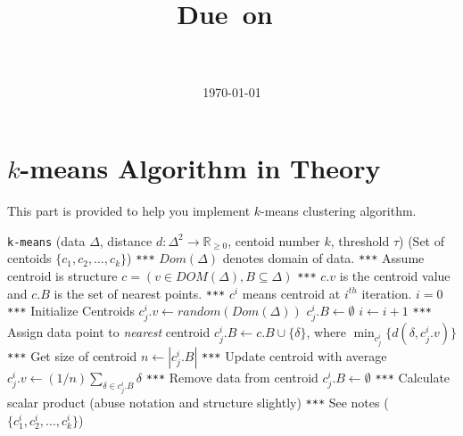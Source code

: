 \documentclass{article}
\title{
\vspace{2in}
\textmd{\textbf{\hmwkClass\ \hmwkTitle}}\\
\normalsize\vspace{0.1in}\small{Due\ on\ \hmwkDueDate}\\
\vspace{0.1in}\large{\textit{\hmwkClassInstructor\ }}
\vspace{3in}
}
\author{\textbf{\hmwkAuthorName}}
\date{\today} %
\begin{document}
\maketitle



\newpage





\section*{ $k$-means Algorithm in Theory}
This part is provided to help you implement $k$-means clustering algorithm.

{\small
\begin{center}
\begin{algorithmic}[1]\label{kmeans}
 \texttt{k-means}
 (\textsf{data} $\Delta$, distance $d:\Delta^2\rightarrow \mathbb{R}_{\geq 0}$, \textsf{centoid number} $k$, \textsf{threshold} $\tau$)
 (\textsf{Set of centoids} $\{c_1, c_2, \ldots, c_k\}$)
\State
\State \texttt{***} $Dom(\Delta)$ denotes domain of data.
\State
\State \texttt{***} Assume centroid is structure $c = (v \in DOM(\Delta), B\subseteq \Delta)$
\State  \texttt{***} $c.v$ is the centroid value and $c.B$ is the set of nearest points.
\State \texttt{***}  $c^{i}$ means centroid at $i^{th}$ iteration. 
\State
\State $i = 0$
\State \texttt{***} Initialize Centroids
\State $c_j^i.v \gets  random(Dom(\Delta))$
\State $c_j^i.B \gets \emptyset$
\EndFor
\State
\Repeat
\State $i \gets i + 1$
\State \texttt{***} Assign data point to {\it nearest} centroid
\For {$\delta \in \Delta$}
\State $c_j^i.B \gets c.B \cup \{\delta\}$, where $\min_{c_j^i}\{d(\delta, c_j^i.v)\}$
\EndFor
{}
\State \texttt{***} Get size of centroid
\State $n \gets |c_j^i.B|$
\State \texttt{***} Update centroid with average 
\State $c_j^i.v \gets (1/n)\sum_{\delta \in c_j^i.B} \delta$
\State \texttt{***} Remove data from centroid
\State $c_j^i.B \gets \emptyset$
\EndFor
\State \texttt{***} Calculate scalar product (abuse notation and structure slightly)
\State \texttt{***} See notes
 ($\{c_1^i, c_2^i, \ldots, c_k^i\}$) 
\end{algorithmic}
\end{center}}
\end{document}
